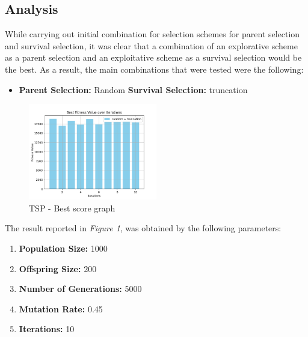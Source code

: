 \documentclass[12pt]{article}
\begin{document}
\subsection{Analysis}

While carrying out initial combination for selection schemes for parent selection and survival selection, it was clear that a combination of an explorative scheme as a parent selection and an exploitative scheme as a survival selection would be the best. As a result, the main combinations that were tested were the following:

    \begin{itemize}
        \item \textbf{Parent Selection:} Random \textbf{Survival Selection:} truncation
    \end{itemize}


\begin{figure}[h]
    \centering
    \includegraphics[width=0.5\textwidth]{images/figure_1.png}
    \caption{TSP - Best score graph}
\end{figure}


The result reported in \textit{Figure 1}, was obtained by the following parameters:

\begin{enumerate}
    \item \textbf{Population Size:} 1000
    \item \textbf{Offspring Size:} 200
    \item \textbf{Number of Generations:} 5000
    \item \textbf{Mutation Rate:} 0.45
    \item \textbf{Iterations:} 10
\end{enumerate}
\end{document}
